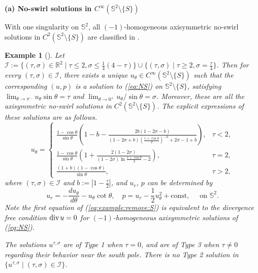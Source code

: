 \documentclass[12pt]{article}
\newtheorem{example}{Example}[section]
\newcommand{\dive}{{\rm div \hspace{0.05cm} }}
\newcommand{\bS}{\mathbb{S}}
\begin{document}
\medskip

\noindent\textbf{(a) No-swirl solutions in $C^{\infty}(\mathbb{S}^2\setminus\{S\})$}

With one singularity on $\bS^2$, all $(-1)$-homogeneous axisymmetric no-swirl solutions in $C^2(\mathbb{S}^2\setminus\{S\})$ are classified in \cite{LLY1}. 

\begin{example}[\cite{LLY1}]\label{example:remove:S}
	Let $\mathcal{I} := \{(\tau,\sigma)\in\mathbb{R}^2\mid \tau\le 2, \sigma \le \frac{1}{4}(4-\tau)\}\cup \{(\tau,\sigma)\mid \tau\ge 2, \sigma =\frac{\tau}{4}\}$. Then for every $ (\tau, \sigma)\in \mathcal{I}$, there exists a unique $u_{\theta}\in C^{\infty}(\mathbb{S}^2\setminus\{S\})$ such that the corresponding $(u,p)$ is a solution to (\ref{eq:NS}) on $\mathbb{S}^2\setminus\{S\}$, satisfying $\lim_{\theta\to \pi^-} u_{\theta}\sin\theta=\tau$ and $\lim_{\theta\to 0^+}u_{\theta}/\sin\theta=\sigma$. Moreover, these are all the axisymmetric no-swirl solutions in $C^2(\mathbb{S}^2\setminus\{S\})$.	The explicit expressions of these solutions are as follows. 
	\begin{equation}
		u_\theta = 
		\left\{
		\begin{array}{ll}
			\frac{\displaystyle 1-\cos\theta}{\displaystyle \sin\theta}\left(1- b - \frac{\displaystyle 2 b(1-2\sigma-b)}{\displaystyle(1-2\sigma+b) (\frac{1+\cos\theta}{2})^{-b} + 2\sigma-1 + b} \right), & \tau<2, \\
			\frac{\displaystyle 1-\cos\theta}{\displaystyle \sin\theta} \left( 1+ \frac{\displaystyle 2 (1-2\sigma) }{ \displaystyle (1-2\sigma) \ln \frac{1+\cos\theta}{2} - 2 } \right), & \tau=2, \\
			\frac{\displaystyle (1+b)(1-\cos\theta)}{\displaystyle \sin\theta}, & \tau>2, 
		\end{array}
		\right. 
	\end{equation}
	where $(\tau, \sigma)\in \mathcal{I}$ and $b := |1-\frac{\tau}{2}|$, and $u_{r}$, $p$ can be determined by 
	\begin{equation}\label{eq:example:remove:S}
		u_r = - \frac{d u_{\theta}}{d \theta} - u_{\theta} \cot \theta, \quad p=u_r-\frac{1}{2}u_{\theta}^2 + \textrm{const}, 
		\quad \textrm{ on }\mathbb{S}^2. 
	\end{equation}
	Note the first equation of (\ref{eq:example:remove:S}) is equivalent to the divergence free condition $\dive u=0$ for $(-1)$-homogeneous axisymmetric solutions of (\ref{eq:NS}). 

	The solutions $u^{\tau, \sigma}$ are of Type 1 when $\tau=0$, and are of Type 3 when $\tau\ne 0$ regarding their behavior near the south pole. There is no Type 2 solution in $\{u^{\tau, \sigma}\mid (\tau, \sigma)\in \mathcal{I}\}$.
	

\end{example}
\end{document}
